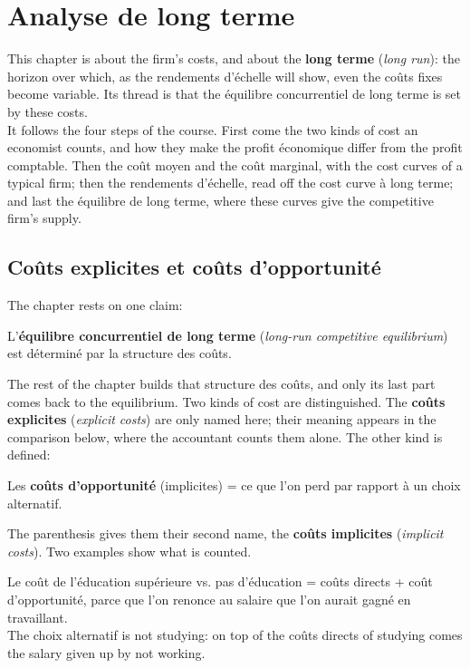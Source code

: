 \section{Analyse de long terme}

This chapter is about the firm's costs, and about the \textbf{long terme}
(\textit{long run}): the horizon over which, as the rendements d'échelle will show,
even the coûts fixes become variable. Its thread is that the équilibre
concurrentiel de long terme is set by these costs.\\

It follows the four steps of the course. First come the two kinds of cost an
economist counts, and how they make the profit économique differ from the profit
comptable. Then the coût moyen and the coût marginal, with the cost curves of a
typical firm; then the rendements d'échelle, read off the cost curve à long terme;
and last the équilibre de long terme, where these curves give the competitive
firm's supply.

\subsection{Coûts explicites et coûts d'opportunité}

The chapter rests on one claim:
\begin{prop}
  L'\textbf{équilibre concurrentiel de long terme}
  (\textit{long-run competitive equilibrium}) est déterminé par la structure des
  coûts.
\end{prop}
The rest of the chapter builds that structure des coûts, and only its last part
comes back to the equilibrium. Two kinds of cost are distinguished. The
\textbf{coûts explicites} (\textit{explicit costs}) are only named here; their
meaning appears in the comparison below, where the accountant counts them alone. The
other kind is defined:

\begin{definition}
  Les \textbf{coûts d'opportunité} (implicites) = ce que l'on perd par rapport à un
  choix alternatif.
\end{definition}
The parenthesis gives them their second name, the \textbf{coûts implicites}
(\textit{implicit costs}). Two examples show what is counted.

\begin{example}
  Le coût de l'éducation supérieure vs. pas d'éducation = coûts directs + coût
  d'opportunité, parce que l'on renonce au salaire que l'on aurait gagné en
  travaillant.\\

  The choix alternatif is not studying: on top of the coûts directs of studying
  comes the salary given up by not working.
\end{example}

